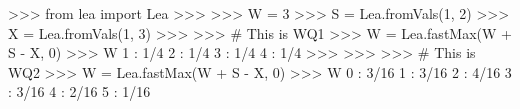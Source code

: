 
>>> from lea import Lea
>>>
>>> W = 3
>>> S = Lea.fromVals(1,  2)
>>> X = Lea.fromVals(1,  3)
>>>
>>> # This is WQ1
>>> W = Lea.fastMax(W + S - X, 0)
>>> W
1 : 1/4
2 : 1/4
3 : 1/4
4 : 1/4
>>>
>>>
>>> # This is WQ2
>>> W = Lea.fastMax(W + S - X, 0)
>>> W
0 : 3/16
1 : 3/16
2 : 4/16
3 : 3/16
4 : 2/16
5 : 1/16

